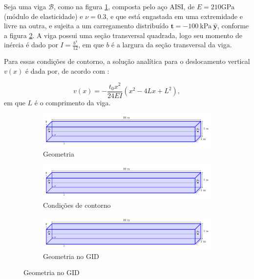 Seja uma viga $\mathcal{B}$, como na figura \ref{fig:viga_longa_geometria}, composta pelo aço AISI, de $E = 210 \text{GPa}$ (módulo de elasticidade) e $\nu = 0.3$, e que está engastada em uma extremidade e livre na outra, e sujeita a um carregamento distribuído $\bm{t} = -100 \ \text{kPa} \ \hat{\bm{y}}$, conforme a figura \ref{fig:viga_longa_condicoes}. A viga possui uma seção transversal quadrada, logo seu momento de inércia é dado por $I = \frac{b^4}{12}$, em que $b$ é a largura da seção transversal da viga.

Para essas condições de contorno, a solução analítica para o deslocamento vertical $v(x)$ é dada por, de acordo com :

\begin{equation}
    v(x) = -\frac{t_0 x^2}{24EI} \left(x^2 - 4 Lx + L^2\right),
\end{equation}
em que $L$ é o comprimento da viga.

\begin{figure}
    \centering
    \caption{Uma viga longa.}
    \begin{subfigure}[c]{\textwidth}
        \centering
        \includegraphics[page=1,width=\textwidth]{Figuras/viga_longa.pdf}
        \caption{Geometria}
        \label{fig:viga_longa_geometria}
    \end{subfigure}
    \begin{subfigure}[c]{\textwidth}
        \centering  
        \includegraphics[page=2, width=\textwidth]{Figuras/viga_longa.pdf}
        \caption{Condições de contorno}
        \label{fig:viga_longa_condicoes}
    \end{subfigure}
    \begin{subfigure}[c]{\textwidth}
        \centering  
        \includegraphics[page=4, width=\textwidth]{Figuras/viga_longa.pdf}
        \caption{Geometria no GID}
        \label{fig:viga_longa_GID}
    \end{subfigure}
\end{figure}

